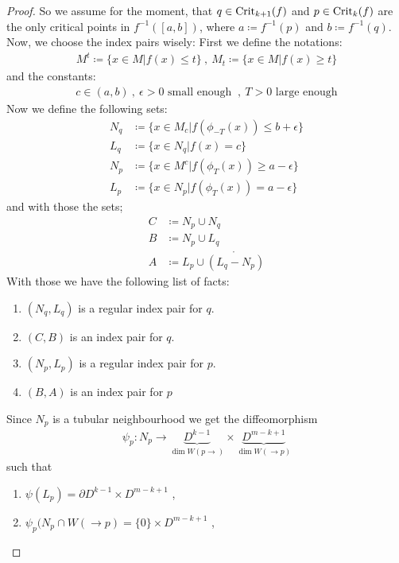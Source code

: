\begin{proof}
So we assume for the moment, that $q\in \mathrm{Crit}_{k+1}(f)$ and $p\in \mathrm{Crit}_k(f)$ are the only critical points in $f^{-1}([a,b])$, where $a\coloneq f^{-1}(p)$ and $b\coloneq f^{-1}(q)$.
Now, we choose the index pairs wisely:
First we define the notations:
\begin{align*}
	M^t\coloneq \{x\in M| f(x)\leq t\}~,~ M_t\coloneq \{x\in M| f(x)\geq t\}
\end{align*}
and the constants:
\begin{align*}
	c\in (a,b)~,~ \epsilon>0 \text{ small enough }~,~ T>0 \text{ large enough}
\end{align*}
Now we define the following sets:
\begin{align*}
	N_q  & \coloneq    \{ x\in M_c |f(\phi_{-T}(x))  \leq b+ \epsilon  \}    \\
	L_q  & \coloneq    \{ x\in N_q |f(x)             =    c            \}    \\
	N_p  & \coloneq    \{ x\in M^c |f(\phi_T(x))     \geq a-\epsilon   \}    \\
	L_p  & \coloneq    \{ x\in N_p |f( \phi_T(x))    =    a-\epsilon   \}
\end{align*}
and with those the sets;
\begin{align*}
	C  & \coloneq  N_p \cup N_q                      \\
	B  & \coloneq  N_p \cup L_q                      \\
	A  & \coloneq  L_p \cup \mathring{(L_q-N_p)}
\end{align*}
With those we have the following list of facts:
\begin{enumerate}
	\item $(N_q,L_q)$ is a regular index pair for $q$.
	\item $(C,B)$ is an index pair for $q$.
	\item $(N_p,L_p)$ is a regular index pair for $p$.
	\item $(B,A)$ is an index pair for $p$
\end{enumerate}
 Since $N_p$ is a tubular neighbourhood we get the diffeomorphism 
\begin{align*}
	\psi_p:N_p\to \underbrace{D^{k-1}}_{\dim W(p \to)}\times \underbrace{D^{m-k+1}}_{\dim W(\to p)}
\end{align*} such that
\begin{enumerate}
	\item $\psi(L_p)=\partial D^{k-1}\times D^{m-k+1}$ ,
	\item $\psi_p(N_p\cap W(\to p)=\{0\}\times D^{m-k+1}$ ,

\end{enumerate}
\end{proof}
